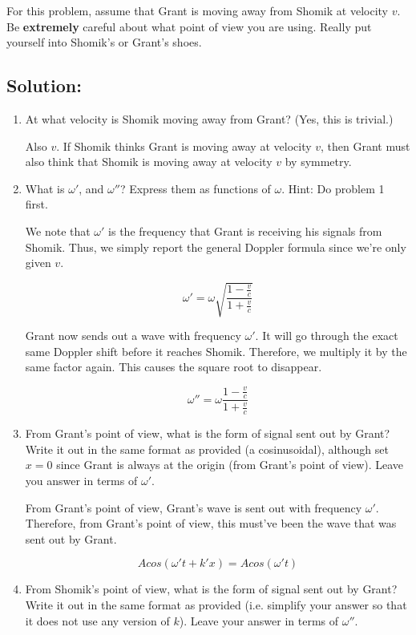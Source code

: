 \documentclass{article}
\begin{document}
For this problem, assume that Grant is moving away from Shomik at velocity $v$. Be \textbf{extremely} careful about what point of view you are using. Really put yourself into Shomik's or Grant's shoes.

\subsection{Solution:}

\begin{enumerate}[label=(\alph*)]
    \item At what velocity is Shomik moving away from Grant? (Yes, this is trivial.)

    Also $\boxed{v}$. If Shomik thinks Grant is moving away at velocity $v$, then Grant must also think that Shomik is moving away at velocity $v$ by symmetry.
    
    \item What is $\omega'$, and $\omega''$? Express them as functions of $\omega$. Hint: Do problem 1 first.

    We note that $\omega'$ is the frequency that Grant is receiving his signals from Shomik. Thus, we simply report the general Doppler formula since we're only given $v$.

    $$\boxed{\omega' = \omega \sqrt{\frac{1 - \frac{v}{c}}{1 + \frac{v}{c}}}}$$

    Grant now sends out a wave with frequency $\omega'$. It will go through the exact same Doppler shift before it reaches Shomik. Therefore, we multiply it by the same factor again. This causes the square root to disappear.

    $$\boxed{\omega'' = \omega \frac{1 - \frac{v}{c}}{1 + \frac{v}{c}}}$$

    \item From Grant's point of view, what is the form of signal sent out by Grant? Write it out in the same format as provided (a cosinusoidal), although set $x = 0$ since Grant is always at the origin (from Grant's point of view). Leave you answer in terms of $\omega'$.

    From Grant's point of view, Grant's wave is sent out with frequency $\omega'$. Therefore, from Grant's point of view, this must've been the wave that was sent out by Grant.
    
    $$Acos(\omega' t + k'x) = \boxed{Acos(\omega' t)}$$
    
    \item From Shomik's point of view, what is the form of signal sent out by Grant? Write it out in the same format as provided (i.e. simplify your answer so that it does not use any version of $k$). Leave your answer in terms of $\omega''$.
    

\end{enumerate}
\end{document}
